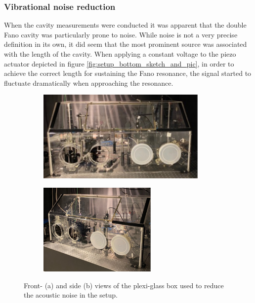 \subsubsection{Vibrational noise reduction}\label{sec:vibrational_noise_reduction}

When the cavity measurements were conducted it was apparent that the double Fano cavity was particularly prone to noise. While noise is not a very precise definition in its own, it did seem that the most prominent source was associated with the length of the cavity. When applying a constant voltage to the piezo actuator depicted in figure \ref{fig:setup_bottom_sketch_and_pic}, in order to achieve the correct length for sustaining the Fano resonance, the signal started to fluctuate dramatically when approaching the resonance. 

\begin{figure}[h!]
    \centering
    \begin{subfigure}[b]{0.49\textwidth}
        \centering
        \includegraphics[height=4.5cm]{figures/noise_box_front.pdf}
        \caption{}
        \label{fig:box_front}
    \end{subfigure}
    \begin{subfigure}[b]{0.49\textwidth}
        \centering
        \includegraphics[height=4.5cm]{figures/noise_box_side.pdf}
        \caption{}
        \label{fig:box_side}
    \end{subfigure}
    \caption{Front- (a) and side (b) views of the plexi-glass box used to reduce the acoustic noise in the setup.}
    \label{fig:noise_box}
\end{figure}

